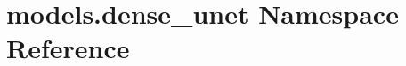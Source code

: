 \hypertarget{namespacemodels_1_1dense__unet}{}\section{models.\+dense\+\_\+unet Namespace Reference}
\label{namespacemodels_1_1dense__unet}
